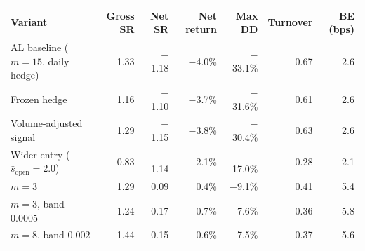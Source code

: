 \setlength{\tabcolsep}{4pt}
\begin{tabular}{@{}lrrrrrr@{}}
\toprule
Variant & Gross SR & Net SR & Net return & Max DD & Turnover & BE (bps)\\
\midrule
AL baseline ($m=15$, daily hedge) & 1.33 & \ensuremath{-}1.18 & \ensuremath{-}4.0\% & \ensuremath{-}33.1\% & 0.67 & 2.6\\
Frozen hedge & 1.16 & \ensuremath{-}1.10 & \ensuremath{-}3.7\% & \ensuremath{-}31.6\% & 0.61 & 2.6\\
Volume-adjusted signal & 1.29 & \ensuremath{-}1.15 & \ensuremath{-}3.8\% & \ensuremath{-}30.4\% & 0.63 & 2.6\\
Wider entry ($\bar s_{\text{open}}=2.0$) & 0.83 & \ensuremath{-}1.14 & \ensuremath{-}2.1\% & \ensuremath{-}17.0\% & 0.28 & 2.1\\
$m=3$ & 1.29 & 0.09 & 0.4\% & \ensuremath{-}9.1\% & 0.41 & 5.4\\
$m=3$, band $0.0005$ & 1.24 & 0.17 & 0.7\% & \ensuremath{-}7.6\% & 0.36 & 5.8\\
$m=8$, band $0.002$ & 1.44 & 0.15 & 0.6\% & \ensuremath{-}7.5\% & 0.37 & 5.6\\
\bottomrule
\end{tabular}
